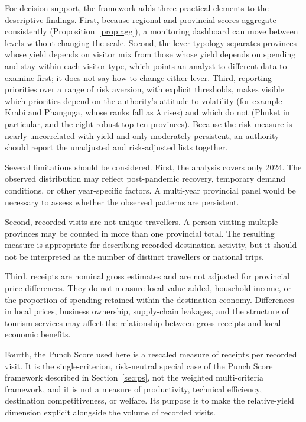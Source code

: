 \documentclass[11pt,a4paper]{article}
\theoremstyle{plain}\newtheorem{proposition}{Proposition}
\theoremstyle{definition}\newtheorem{definition}{Definition}
\begin{document}
For decision support, the framework adds three practical elements to the descriptive findings. First, because regional and provincial scores aggregate consistently (Proposition~\ref{prop:agg}), a monitoring dashboard can move between levels without changing the scale. Second, the lever typology separates provinces whose yield depends on visitor mix from those whose yield depends on spending and stay within each visitor type, which points an analyst to different data to examine first; it does not say how to change either lever. Third, reporting priorities over a range of risk aversion, with explicit thresholds, makes visible which priorities depend on the authority's attitude to volatility (for example Krabi and Phangnga, whose ranks fall as $\lambda$ rises) and which do not (Phuket in particular, and the eight robust top-ten provinces). Because the risk measure is nearly uncorrelated with yield and only moderately persistent, an authority should report the unadjusted and risk-adjusted lists together.

Several limitations should be considered. First, the analysis covers only 2024. The observed distribution may reflect post-pandemic recovery, temporary demand conditions, or other year-specific factors. A multi-year provincial panel would be necessary to assess whether the observed patterns are persistent.

Second, recorded visits are not unique travellers. A person visiting multiple provinces may be counted in more than one provincial total. The resulting measure is appropriate for describing recorded destination activity, but it should not be interpreted as the number of distinct travellers or national trips.

Third, receipts are nominal gross estimates and are not adjusted for provincial price differences. They do not measure local value added, household income, or the proportion of spending retained within the destination economy. Differences in local prices, business ownership, supply-chain leakages, and the structure of tourism services may affect the relationship between gross receipts and local economic benefits.

Fourth, the Punch Score used here is a rescaled measure of receipts per recorded visit. It is the single-criterion, risk-neutral special case of the Punch Score framework described in Section~\ref{sec:ps}, not the weighted multi-criteria framework, and it is not a measure of productivity, technical efficiency, destination competitiveness, or welfare. Its purpose is to make the relative-yield dimension explicit alongside the volume of recorded visits.
\end{document}
